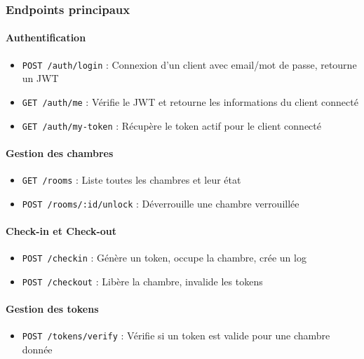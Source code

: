 \documentclass[11pt,a4paper]{article}
\begin{document}
\subsubsection{Endpoints principaux}

\paragraph{Authentification}
\begin{itemize}
    \item \texttt{POST /auth/login} : Connexion d'un client avec email/mot de passe, retourne un JWT
    \item \texttt{GET /auth/me} : Vérifie le JWT et retourne les informations du client connecté
    \item \texttt{GET /auth/my-token} : Récupère le token actif pour le client connecté
\end{itemize}

\paragraph{Gestion des chambres}
\begin{itemize}
    \item \texttt{GET /rooms} : Liste toutes les chambres et leur état
    \item \texttt{POST /rooms/:id/unlock} : Déverrouille une chambre verrouillée
\end{itemize}

\paragraph{Check-in et Check-out}
\begin{itemize}
    \item \texttt{POST /checkin} : Génère un token, occupe la chambre, crée un log
    \item \texttt{POST /checkout} : Libère la chambre, invalide les tokens
\end{itemize}

\paragraph{Gestion des tokens}
\begin{itemize}
    \item \texttt{POST /tokens/verify} : Vérifie si un token est valide pour une chambre donnée
\end{itemize}
\end{document}
